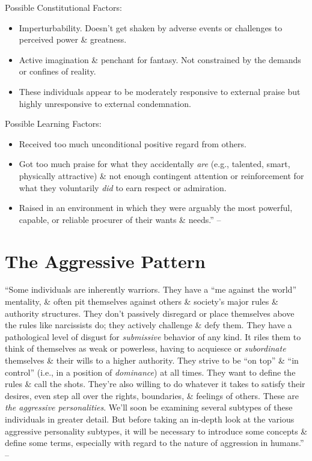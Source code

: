 \documentclass{article}
\numberwithin{equation}{section}
\begin{document}
Possible Constitutional Factors:
\begin{itemize}
	\item Imperturbability. Doesn't get shaken by adverse events or challenges to perceived power \& greatness.
	\item Active imagination \& penchant for fantasy. Not constrained by the demands or confines of reality.
	\item These individuals appear to be moderately responsive to external praise but highly unresponsive to external condemnation.
\end{itemize}
Possible Learning Factors:
\begin{itemize}
	\item Received too much unconditional positive regard from others.
	\item Got too much praise for what they accidentally \textit{are} (e.g., talented, smart, physically attractive) \& not enough contingent attention or reinforcement for what they voluntarily \textit{did} to earn respect or admiration.
	\item Raised in an environment in which they were arguably the most powerful, capable, or reliable procurer of their wants \& needs.'' -- \cite[pp. 77--86]{Simon2011}
\end{itemize}


\section{The Aggressive Pattern}
``Some individuals are inherently warriors. They have a ``me against the world'' mentality, \& often pit themselves against others \& society's major rules \& authority structures. They don't passively disregard or place themselves above the rules like narcissists do; they actively challenge \& defy them. They have a pathological level of disgust for \textit{submissive} behavior of any kind. It riles them to think of themselves as weak or powerless, having to acquiesce or \textit{subordinate} themselves \& their wills to a higher authority. They strive to be ``on top'' \& ``in control'' (i.e., in a position of \textit{dominance}) at all times. They want to define the rules \& call the shots. They're also willing to do whatever it takes to satisfy their desires, even step all over the rights, boundaries, \& feelings of others. These are \textit{the aggressive personalities}. We'll soon be examining several subtypes of these individuals in greater detail. But before taking an in-depth look at the various aggressive personality subtypes, it will be necessary to introduce some concepts \& define some terms, especially with regard to the nature of aggression in humans.'' -- \cite[p. 87]{Simon2011}
\end{document}

